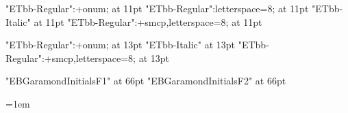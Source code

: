 



\font\elevenrm "ETbb-Regular":+onum; at 11pt\relax
\font\elevenrmspaced "ETbb-Regular":letterspace=8; at 11pt\relax
\font\elevenit "ETbb-Italic" at 11pt\relax
\font\elevensc "ETbb-Regular":+smcp,letterspace=8; at 11pt\relax

\font\fourteenrm "ETbb-Regular":+onum; at 13pt\relax
\font\fourteenit "ETbb-Italic" at 13pt\relax
\font\fourteensc "ETbb-Regular":+smcp,letterspace=8; at 13pt\relax

\font\ebginitbg "EBGaramondInitialsF1" at 66pt
\font\ebginitfg "EBGaramondInitialsF2" at 66pt


\def\normalsize{%
	\gdef\rm{\elevenrm}%
	\gdef\rmspaced{\elevenrmspaced}%
	\gdef\it{\elevenit}%
	\gdef\sc{\elevensc}%
}

\def\chaptersize{%
	\gdef\rm{\fourteenrm}%
	\gdef\it{\fourteenit}%
	\gdef\sc{\fourteensc}%
}

\let\emph\it

\normalsize\rm


\baselineskip=15pt

\frenchspacing

\parskip=0pt

\parindent=1em

\emergencystretch=0pt

\def\firstnoindent{\global\everypar={\wipeeverypar\setbox7=\lastbox}}
\def\wipeeverypar{\global\everypar={}}

{}


\def\beginchapter#1#2{%
	\centerline{\smash{\normalsize\rmspaced\uppercase{#1}}}
	\vskip\baselineskip
	\centerline{\smash{\normalsize\rmspaced
	\spaceskip=5pt
	\uppercase{#2}}}
	\vskip3\baselineskip
	\firstnoindent
}

